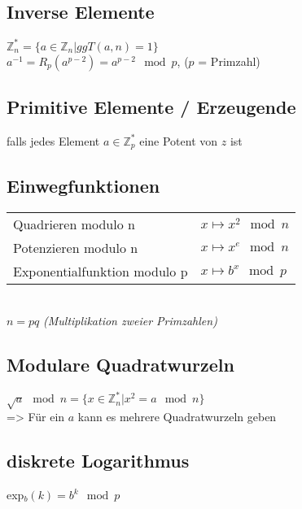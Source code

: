 \subsection{Inverse Elemente}
$ \mathbb{Z}_n^* = \{ a \in \mathbb{Z}_n | ggT(a, n) = 1 \} $ \\
$ a^{-1} = R_p(a^{p-2}) = a^{p-2} \mod p $, ($p$ = Primzahl)

\subsection{Primitive Elemente / Erzeugende}
falls jedes Element $a \in \mathbb{Z}_p^* $ eine Potent von $z$ ist

\subsection{Einwegfunktionen}
\begin{tabular}{ll}
    Quadrieren modulo n & $ x \mapsto x^2 \mod n$ \\
    Potenzieren modulo n & $ x \mapsto x^e \mod n$ \\
    Exponentialfunktion modulo p & $ x \mapsto b^x \mod p$ \\
\end{tabular} \\

$ n = pq $ \textit{(Multiplikation zweier Primzahlen)}

\subsection{Modulare Quadratwurzeln}
$ \sqrt{a} \mod n = \{ x \in \mathbb{Z}_n^* | x^2 = a \mod n \} $ \\
=> Für ein $a$ kann es mehrere Quadratwurzeln geben

\subsection{diskrete Logarithmus}
exp$_b(k) = b^k \mod p$

